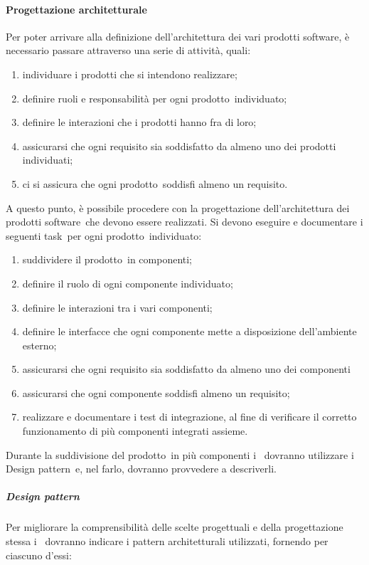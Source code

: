 \documentclass[../NormeProgetto.text]{subfiles}
\begin{document}
		\paragraph{Progettazione architetturale}
			Per poter arrivare alla definizione dell'architettura dei vari prodotti software\g, è necessario passare attraverso una serie di attività, quali:
			\begin{enumerate}
				\item individuare i prodotti che si intendono realizzare;
				\item definire ruoli e responsabilità per ogni prodotto\g\ individuato;
				\item definire le interazioni che i prodotti hanno fra di loro;
				\item assicurarsi che ogni requisito sia soddisfatto da almeno uno dei prodotti individuati;
				\item ci si assicura che ogni prodotto\g\ soddisfi almeno un requisito.
			\end{enumerate}
			A questo punto, è possibile procedere con la progettazione dell'architettura dei prodotti software\g\ che devono essere realizzati. Si devono eseguire e documentare i seguenti task\g\ per ogni prodotto\g\ individuato:
			\begin{enumerate}
				\item suddividere il prodotto\g\ in componenti;
				\item definire il ruolo di ogni componente individuato;
				\item definire le interazioni tra i vari componenti;
				\item definire le interfacce che ogni componente mette a disposizione dell'ambiente esterno;
				\item assicurarsi che ogni requisito sia soddisfatto da almeno uno dei componenti
				\item assicurarsi che ogni componente soddisfi almeno un requisito;
				\item realizzare e documentare i test di integrazione, al fine di verificare il corretto funzionamento di più componenti integrati assieme.
			\end{enumerate}
			Durante la suddivisione del prodotto\g\ in più componenti i \progettisti\ dovranno utilizzare i Design pattern\g\ e, nel farlo, dovranno provvedere a descriverli.
			\subparagraph{Design pattern}
				Per migliorare la comprensibilità delle scelte progettuali e della progettazione stessa i \progettisti\ dovranno indicare i pattern architetturali utilizzati, fornendo per ciascuno d'essi:
\end{document}
